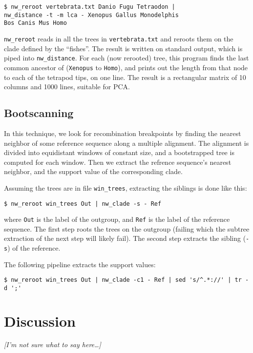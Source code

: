 \documentclass{article}
\newcommand{\prog}[1]{\texttt{nw\_#1}}
\begin{document}
\begin{verbatim}
$ nw_reroot vertebrata.txt Danio Fugu Tetraodon | 
nw_distance -t -m lca - Xenopus Gallus Monodelphis
Bos Canis Mus Homo 
\end{verbatim}

\prog{reroot} reads in all the trees in \texttt{vertebrata.txt} and reroots
them on the clade defined by the ``fishes''. The result is written on standard
output, which is piped into \prog{distance}. For each (now rerooted) tree,
this program finds the last common ancestor of (\texttt{Xenopus} to
\texttt{Homo}), and prints out the length from that node to each of the
tetrapod tips, on one line. The result is a rectangular matrix of 10 columns
and 1000 lines, suitable for \textsc{PCA}.

\subsection*{Bootscanning}

In this technique, we look for recombination breakpoints by finding the nearest neighbor of some reference sequence along a multiple alignment. The alignment is divided into equidistant windows of constant size, and a bootstrapped tree is computed for each window. Then we extract the refrence sequence's nearest neighbor, and the support value of the corresponding clade.

Assuming the trees are in file \verb|win_trees|, extracting the siblings is done like this:
\begin{verbatim}
$ nw_reroot win_trees Out | nw_clade -s - Ref 
\end{verbatim}
where \texttt{Out} is the label of the outgroup, and \texttt{Ref} is the label of the reference sequence. The first step roots the trees on the outgroup (failing which the subtree extraction of the next step will likely fail). The second step extracts the sibling (\texttt{-s}) of the reference. 

The following pipeline extracts the support values:
\begin{verbatim}
$ nw_reroot win_trees Out | nw_clade -c1 - Ref | sed 's/^.*://' | tr -d ';'
\end{verbatim}

\section{Discussion}

\emph{[I'm not sure what to say here\ldots]}
\end{document}

